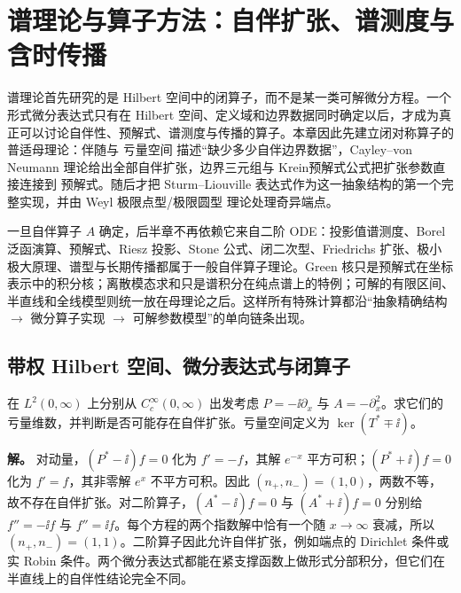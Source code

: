 \chapter{谱理论与算子方法：自伴扩张、谱测度与含时传播} \label{chap:math-unbounded} \label{chap:math-spectrum}
\label{chap:ghs-self-adjoint-spectra}
\label{chap:ghs-spectral-foundations}
\label{chap:ghs-r6-continuous-spectrum}

谱理论首先研究的是 Hilbert 空间中的闭算子，而不是某一类可解微分方程。一个形式微分表达式只有在 Hilbert 空间、定义域和边界数据同时确定以后，才成为真正可以讨论自伴性、预解式、谱测度与传播的算子。本章因此先建立闭对称算子的普适母理论：伴随与 亏量空间 描述“缺少多少自伴边界数据”，Cayley--von Neumann 理论给出全部自伴扩张，边界三元组与 Krein预解式公式把扩张参数直接连接到 预解式。随后才把 Sturm--Liouville 表达式作为这一抽象结构的第一个完整实现，并由 Weyl 极限点型/极限圆型 理论处理奇异端点。

一旦自伴算子 $A$ 确定，后半章不再依赖它来自二阶 ODE：投影值谱测度、Borel 泛函演算、预解式、Riesz 投影、Stone 公式、闭二次型、Friedrichs 扩张、极小极大原理、谱型与长期传播都属于一般自伴算子理论。Green 核只是预解式在坐标表示中的积分核；离散模态求和只是谱积分在纯点谱上的特例；可解的有限区间、半直线和全线模型则统一放在母理论之后。这样所有特殊计算都沿“抽象精确结构 $\to$ 微分算子实现 $\to$ 可解参数模型”的单向链条出现。



\section{带权 Hilbert 空间、微分表达式与闭算子}

\begin{workedexample}[半直线动量与二阶算子的亏量]
在 \(L^2(0,\infty)\) 上分别从 \(C_c^\infty(0,\infty)\) 出发考虑 \(P=-\ii\partial_x\) 与 \(A=-\partial_x^2\)。求它们的亏量维数，并判断是否可能存在自伴扩张。亏量空间定义为 \(\ker(T^*\mp\ii)\)。

\textbf{解。} 对动量，\((P^*-\ii)f=0\) 化为 \(f'=-f\)，其解 \(e^{-x}\) 平方可积；\((P^*+\ii)f=0\) 化为 \(f'=f\)，其非零解 \(e^x\) 不平方可积。因此 \((n_+,n_-)=(1,0)\)，两数不等，故不存在自伴扩张。对二阶算子，\((A^*-\ii)f=0\) 与 \((A^*+\ii)f=0\) 分别给 \(f''=-\ii f\) 与 \(f''=\ii f\)。每个方程的两个指数解中恰有一个随 \(x\to\infty\) 衰减，所以 \((n_+,n_-)=(1,1)\)。二阶算子因此允许自伴扩张，例如端点的 Dirichlet 条件或实 Robin 条件。两个微分表达式都能在紧支撑函数上做形式分部积分，但它们在半直线上的自伴性结论完全不同。

\end{workedexample}

